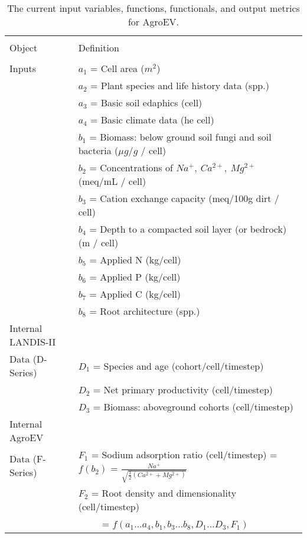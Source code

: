 \documentclass[12pt, letterpaper]{article}
\begin{document}
\begin{table}
\footnotesize
  \begin{threeparttable}[b]
    \caption{The current input variables, functions, functionals, and output metrics for AgroEV.}
      \label{tab:bm1}
      \centering\captionsetup{width=.75\textwidth}
      \setlength{\tabcolsep}{2 mm}    
    \begin{tabular}{ll}
    \hline \hline \\[-1.8ex]
     Object &  Definition \\
    \hline \\[-1.8ex]
    Inputs \tnote{1} & $a_1$ = Cell area ($m^2$) \\
    & $a_2$ = Plant species and life history data (spp.)\\
    & $a_3$ = Basic soil edaphics (cell) \\
    & $a_4$ = Basic climate data (he cell) \\
    & $b_1$ = Biomass: below ground soil fungi and soil bacteria ($\mu g / g$ / cell)\\
    & $b_2$ = Concentrations of $Na^{+}, \ Ca^{2+}, \ Mg^{2+}$ (meq/mL / cell)\\
    & $b_3$ = Cation exchange capacity (meq/100g dirt / cell)\\
    & $b_4$ = Depth to a compacted soil layer (or bedrock) (m / cell)\\
    & $b_5$ = Applied N (kg/cell)\\
    & $b_6$ = Applied P (kg/cell)\\
    & $b_7$ = Applied C (kg/cell)\\
    & $b_8$ = Root architecture (spp.)\\ 
    Internal LANDIS-II & \\
    Data (D-Series) \tnote{2} & $D_1$ = Species and age (cohort/cell/timestep) \\
    & $D_2$ = Net primary productivity (cell/timestep)\\
    & $D_3$ = Biomass: aboveground cohorts (cell/timestep)\\
    Internal AgroEV & \\
    Data (F-Series) \tnote{3} & $F_1$ = Sodium adsorption ratio (cell/timestep) = $f(b_2)$ = $ {\frac {Na^{+}}{\sqrt {{\tfrac {1}{2}}({Ca^{2+}+Mg^{2+}})}}}$ \\
    & $F_2$ = Root density and dimensionality (cell/timestep) \\
    & \ \ \ \ \ = $f(a_1 \dots a_4, b_1, b_3 \dots b_8, D_1 \dots D_3, F_1)$\\

\end{tabular}
\end{threeparttable}
\end{table}
\end{document}
